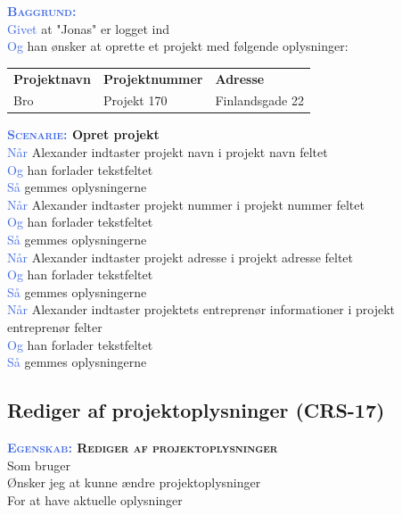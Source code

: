 \textsc{\textcolor{RoyalBlue}{\textbf{Baggrund:}}}\\
\textcolor{RoyalBlue}{Givet} at "Jonas" er logget ind\\
\textcolor{RoyalBlue}{Og} han ønsker at oprette et projekt med følgende oplysninger:\\
\begin{tabular}{| l | l | l |}
	\textbf{Projektnavn} & \textbf{Projektnummer} & \textbf{Adresse} \\
	Bro & Projekt 170 & Finlandsgade 22 \\
\end{tabular}
\newline \newline

\textbf{\textsc{\textcolor{RoyalBlue}{Scenarie:}} Opret projekt}\\
\textcolor{RoyalBlue}{Når} Alexander indtaster projekt navn i projekt navn feltet\\
\textcolor{RoyalBlue}{Og} han forlader tekstfeltet\\
\textcolor{RoyalBlue}{Så} gemmes oplysningerne\\
\textcolor{RoyalBlue}{Når} Alexander indtaster projekt nummer i projekt nummer feltet\\
\textcolor{RoyalBlue}{Og} han forlader tekstfeltet\\
\textcolor{RoyalBlue}{Så} gemmes oplysningerne\\
\textcolor{RoyalBlue}{Når} Alexander indtaster projekt adresse i projekt adresse feltet\\
\textcolor{RoyalBlue}{Og} han forlader tekstfeltet\\
\textcolor{RoyalBlue}{Så} gemmes oplysningerne\\
\textcolor{RoyalBlue}{Når} Alexander indtaster projektets entreprenør informationer i projekt entreprenør felter\\
\textcolor{RoyalBlue}{Og} han forlader tekstfeltet\\
\textcolor{RoyalBlue}{Så} gemmes oplysningerne\\

\subsection{Rediger af projektoplysninger (CRS-17)} \label{sec:USRedigerProjekt}
\textbf{\textsc{\textcolor{RoyalBlue}{Egenskab:} Rediger af projektoplysninger}}\\
Som bruger\\
Ønsker jeg at kunne ændre projektoplysninger\\
For at have aktuelle oplysninger

